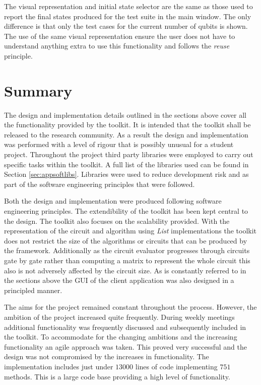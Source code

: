 The visual representation and initial state selector are the same as those used to report the final states produced for the test suite in the main window.
The only difference is that only the test cases for the current number of qubits is shown.
The use of the same visual representation ensure the user does not have to understand anything extra to use this functionality and follows the \emph{reuse} principle.

\section{Summary}

The design and implementation details outlined in the sections above cover all the functionality provided by the toolkit.
It is intended that the toolkit shall be released to the research community.
As a result the design and implementation was performed with a level of rigour that is possibly unusual for a student project.
Throughout the project third party libraries were employed to carry out specific tasks within the toolkit.
A full list of the libraries used can be found in Section \ref{sec:appsoftlibs}.
Libraries were used to reduce development risk and as part of the software engineering principles that were followed.

Both the design and implementation were produced following software engineering principles.
The extendibility of the toolkit has been kept central to the design.
The toolkit also focuses on the scalability provided.
With the representation of the circuit and algorithm using \emph{List} implementations the toolkit does not restrict the size of the algorithms or circuits that can be produced by the framework.
Additionally as the circuit evaluator progresses through circuits gate by gate rather than computing a matrix to represent the whole circuit this also is not adversely affected by the circuit size.
As is constantly referred to in the sections above the GUI of the client application was also designed in a principled manner.


The aims for the project remained constant throughout the process.
However, the ambition of the project increased quite frequently.
During weekly meetings additional functionality was frequently discussed and subsequently included in the toolkit.
To accommodate for the changing ambitions and the increasing functionality an agile approach was taken.
This proved very successful and the design was not compromised by the increases in functionality.
The implementation includes just under $13000$ lines of code implementing $751$ methods.
This is a large code base providing a high level of functionality.

